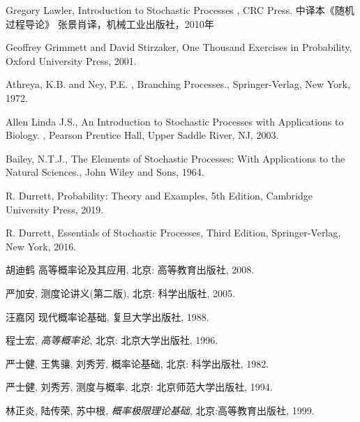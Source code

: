 \newcommand{\auth}[1]{\rm #1}
\newcommand{\refart}[1]{#1}
\newcommand{\refbook}[1]{\emph{#1}}
\newcommand{\journal}[1]{\emph{#1}}
%
\newcommand{\authc}[1]{{\song #1}}  %
\newcommand{\refartc}[1]{{\kai #1}}
\newcommand{\refbookc}[1]{{\kai #1}}
\newcommand{\journalc}[1]{{\song #1}}



\renewcommand{\leftmark}{参考文献}
\begin{thebibliography}{999}

\linespread{1.0}\selectfont

\auth{Gregory Lawler},
\refart{Introduction to Stochastic Processes} ,
CRC Press. 中译本《随机过程导论》  张景肖译，机械工业出版社，2010年

\auth{Geoffrey Grimmett and David Stirzaker},
\refart{One Thousand Exercises in Probability},
Oxford University Press, 2001.


\auth{Athreya, K.B. and Ney, P.E. },
\refart{Branching Processes.},
Springer-Verlag, New York, 1972.

\auth{Allen Linda J.S.},
\refart{An Introduction to Stochastic Processes with Applications to Biology. },
Pearson Prentice Hall, Upper Saddle River, NJ, 2003.

\auth{Bailey, N.T.J.},
\refart{ The Elements of Stochastic Processes: With Applications to the Natural Sciences.},
John Wiley and Sons, 1964.


\auth{R. Durrett},
\refart{Probability: Theory and Examples},
5th Edition, Cambridge University Press, 2019.

\auth{R. Durrett},
\refart{Essentials of Stochastic Processes},
Third Edition, Springer-Verlag, New York, 2016.


\auth{胡迪鹤}
\refart{高等概率论及其应用},
北京: 高等教育出版社, 2008.

\auth{严加安},
\refartc{测度论讲义}(第二版),
北京: 科学出版社, 2005.

\auth{汪嘉冈}
\refartc{现代概率论基础},
复旦大学出版社, 1988.

\auth{程士宏},
\refbook{高等概率论},
北京: 北京大学出版社, 1996.

\auth{严士健, 王隽骧, 刘秀芳},
\refartc{概率论基础},
北京: 科学出版社, 1982.

\auth{严士健, 刘秀芳},
\refartc{测度与概率},
北京: 北京师范大学出版社, 1994.

\auth{林正炎, 陆传荣, 苏中根},
\refbook{概率极限理论基础},
北京:高等教育出版社, 1999.


\end{thebibliography}

